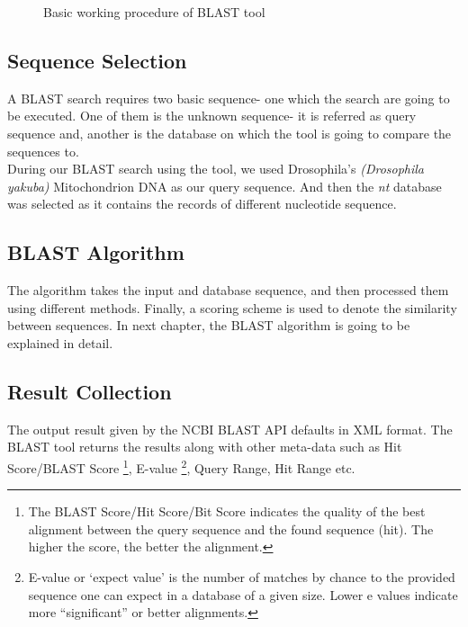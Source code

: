 \documentclass[12pt, a4paper]{report}
\begin{document}
\begin{figure}[H]
    \centering
    \caption{Basic working procedure of BLAST tool}
\end{figure}

\subsection{Sequence Selection}
A BLAST search requires two basic sequence- one which the search are going to be executed. One of them is the unknown sequence- it is referred as query sequence and, another is the database on which the tool is going to compare the sequences to. \\

During our BLAST search using the tool, we used Drosophila’s \textit{(Drosophila yakuba)} Mitochondrion DNA as our query sequence. And then the \textit{nt} database was selected as it contains the records of different nucleotide sequence.

\subsection{BLAST Algorithm}
The algorithm takes the input and database sequence, and then processed them using different methods. Finally, a scoring scheme is used to denote the similarity between sequences. In next chapter, the BLAST algorithm is going to be explained in detail.

\subsection{Result Collection}
The output result given by the NCBI BLAST API defaults in XML format. The BLAST tool returns the results along with other meta-data such as Hit Score/BLAST Score \footnote{The BLAST Score/Hit Score/Bit Score indicates the quality of the best alignment between the query sequence and the found sequence (hit). The higher the score, the better the alignment.}, E-value \footnote{E-value or ‘expect value’ is the number of matches by chance to the provided sequence one can expect in a database of a given size. Lower e values indicate more “significant” or better alignments.}, Query Range, Hit Range etc. \\
\end{document}
